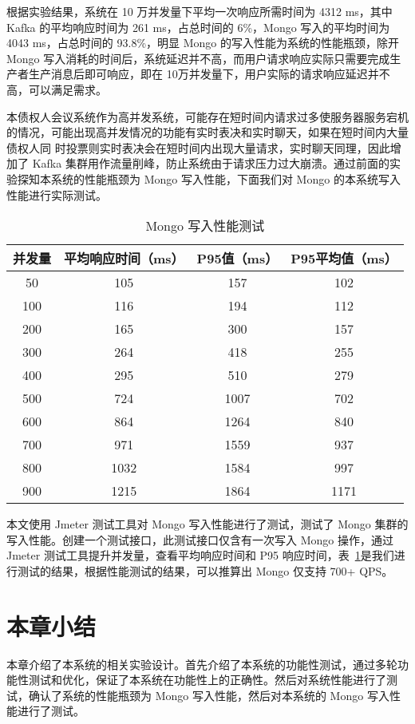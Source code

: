   根据实验结果，系统在 10 万并发量下平均一次响应所需时间为 4312 ms，其中 Kafka 的平均响应时间为 261 ms，占总时间的 6\%，Mongo 写入的平均时间为 4043 ms，占总时间的 93.8\%，明显 Mongo 的写入性能为系统的性能瓶颈，除开 Mongo 写入消耗的时间后，系统延迟并不高，而用户请求响应实际只需要完成生产者生产消息后即可响应，即在 10万并发量下，用户实际的请求响应延迟并不高，可以满足需求。

  本债权人会议系统作为高并发系统，可能存在短时间内请求过多使服务器服务宕机
的情况，可能出现高并发情况的功能有实时表决和实时聊天，如果在短时间内大量债权人同
时投票则实时表决会在短时间内出现大量请求，实时聊天同理，因此增加了 Kafka 集群用作流量削峰，防止系统由于请求压力过大崩溃。通过前面的实验探知本系统的性能瓶颈为 Mongo 写入性能，下面我们对 Mongo 的本系统写入性能进行实际测试。

\begin{table}[h!]
  \begin{center}
    \caption{Mongo 写入性能测试}
    \label{fig:test5}
    \begin{tabular}{ c c c c }
      \hline
      \textbf{并发量} & \textbf{平均响应时间（ms）
      } & \textbf{P95值（ms）
      } & \textbf{P95平均值（ms）
      } \\
      \hline
      50 & 105 & 157 & 102 \\
      100 & 116 & 194 & 112 \\
      200 & 165 & 300 & 157 \\
      300 & 264 & 418 & 255 \\
      400 & 295 & 510 & 279 \\
      500 & 724 & 1007 & 702 \\
      600 & 864 & 1264 & 840 \\
      700 & 971 & 1559 & 937 \\
      800 & 1032 & 1584 & 997 \\
      900 & 1215 & 1864 & 1171 \\
      \hline
    \end{tabular}
  \end{center}
\end{table}

本文使用 Jmeter 测试工具对 Mongo 写入性能进行了测试，测试了 Mongo 集群的写入性能。创建一个测试接口，此测试接口仅含有一次写入 Mongo 操作，通过 Jmeter 测试工具提升并发量，查看平均响应时间和 P95 响应时间，表~\ref{fig:test5}是我们进行测试的结果，根据性能测试的结果，可以推算出 Mongo 仅支持 700+ QPS。

  \section{本章小结}
  本章介绍了本系统的相关实验设计。首先介绍了本系统的功能性测试，通过多轮功能性测试和优化，保证了本系统在功能性上的正确性。然后对系统性能进行了测试，确认了系统的性能瓶颈为 Mongo 写入性能，然后对本系统的 Mongo 写入性能进行了测试。